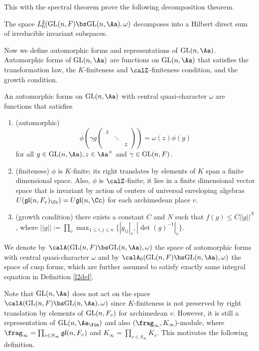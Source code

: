 This with the spectral theorem prove the following decomposition theorem. 

\begin{theorem}
\label{cuspdecomad}
The space $L_{0}^{2} (\GL(n, F) \bs \GL(n, \Aa), \omega)$ decomposes into a Hilbert direct sum of irreducible invariant subspaces. 
\end{theorem}


Now we define automorphic forms and representations of $\GL(n, \Aa)$. 
Automorphic forms of $\GL(n, \Aa)$ are functions on $\GL(n, \Aa)$ that satisfies the transformation law, the $K$-finiteness and $\calZ$-finiteness condition, and the growth condition. 
\begin{definition}
An automorphic forms on $\GL(n, \Aa)$ with central quasi-character $\omega$ are functions that satisfies 
\begin{enumerate}
\item (automorphic) 
$$
\phi\left( \gamma g\begin{pmatrix} z & & \\ & \ddots & \\  & & z\end{pmatrix} \right) = \omega(z)\phi(g)
$$
for all $g\in \GL(n, \Aa), z\in \Aa^{\times}$ and $\gamma\in \mathrm{GL}(n, F)$. 
\item (finiteness) $\phi$ is $K$-finite; its right translates by elements of $K$ span a finite dimensional space. Also, $\phi$ is $\calZ$-finite; it lies in a finite dimensional vector space that is invariant by action of centers of universal enveloping algebras $U(\mathfrak{gl}(n, F_{v})_{\Cc}) = U\mathfrak{gl}(n, \Cc)$ for each archimedean place $v$. 
\item (growth condition) there exists a constant $C$ and $N$ such that $f(g) \leq C||g||^{N}$, where $||g|| := \prod_{v} \max_{1\leq i, j\leq n}\{ |g_{ij}|_{v}, |\det(g)^{-1}|_{v}\}$. 
\end{enumerate}
We denote by $\calA(\GL(n, F)\bs \GL(n, \Aa), \omega)$ the space of automorphic forms with central quasi-character $\omega$ and by $\calA_{0}(\GL(n, F)\bs \GL(n, \Aa), \omega)$ the space of cusp forms, which are further assumed to satisfy exactly same integral equation in Definition \ref{l2def}. 
\end{definition}

Note that $\GL(n, \Aa)$ does not act on the space $\calA(\GL(n, F)\bs \GL(n, \Aa), \omega)$ since $K$-finiteness is not preserved by right translation by elements of $\mathrm{GL}(n, F_{v})$ for archimedean $v$. 
However, it is still a representation of $\GL(n, \Aa_{\fin})$ and also $(\frag_{\infty}, K_{\infty})$-module, where $\frag_{\infty} = \prod_{v\in S_{\infty}}\mathfrak{gl}(n, F_{v})$ and $K_{\infty} = \prod_{v\in S_{\infty}} K_{v}$. 
This motivates the following definition. 


